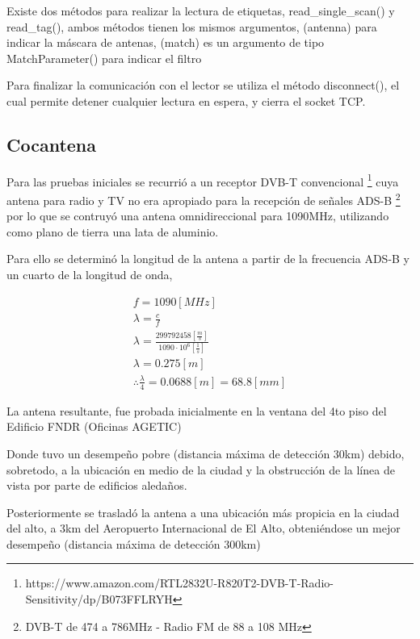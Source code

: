 \documentclass[fleqn,10pt]{SelfArx} %
\begin{document}
Existe dos métodos para realizar la lectura de etiquetas, read_single_scan() y read_tag(), ambos métodos tienen los mismos argumentos, (antenna) para indicar la máscara de antenas, (match) es un argumento de tipo MatchParameter() para indicar el filtro 

Para finalizar la comunicación con el lector se utiliza el método disconnect(), el cual permite detener cualquier lectura en espera, y cierra el socket TCP.



 


\subsection*{Cocantena}

Para las pruebas iniciales se recurrió a un receptor DVB-T convencional \footnote{https://www.amazon.com/RTL2832U-R820T2-DVB-T-Radio-Sensitivity/dp/B073FFLRYH} cuya antena para radio y TV no era apropiado para la recepción de señales ADS-B \footnote{DVB-T de 474 a 786MHz - Radio FM de 88 a 108 MHz} por lo que se contruyó una antena omnidireccional para 1090MHz, utilizando como plano de tierra una lata de aluminio.

Para ello se determinó la longitud de la antena a partir de la frecuencia ADS-B y un cuarto de la longitud de onda,

\begin{multline}
f = 1090 [MHz] \\
\lambda = \frac{c}{f} \\
\lambda = \frac{299792458 [\frac{m}{s}]}{1090 \cdot 10^{6}[\frac{1}{s}]} \\
\lambda = 0.275 [m] \\
\therefore \frac{\lambda}{4} = 0.0688 [m] = 68.8 [mm]
\label{eq:cuarta}
\end{multline}

La antena resultante, fue probada inicialmente en la ventana del 4to piso del Edificio FNDR (Oficinas AGETIC)

Donde tuvo un desempeño pobre (distancia máxima de detección 30km) debido, sobretodo, a la ubicación en medio de la ciudad y la obstrucción de la línea de vista por parte de edificios aledaños.

Posteriormente se trasladó la antena a una ubicación más propicia en la ciudad del alto, a 3km del Aeropuerto Internacional de El Alto, obteniéndose un mejor desempeño (distancia máxima de detección 300km)
\end{document}
